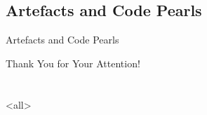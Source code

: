 \subsection{Artefacts and Code Pearls}
\begingroup
{}
\begin{frame}[fragile]{Artefacts and Code Pearls}
\end{frame}
\endgroup

\begin{frame}[plain]
\vfill\vfill
\centerline{Thank You for Your Attention!}
\vfill\vfill\vfill
\end{frame}

\section{\bibname}
\begin{frame}[allowframebreaks]{\bibname}
\printbibliography[heading=none]
\end{frame}

\mode
<all>
